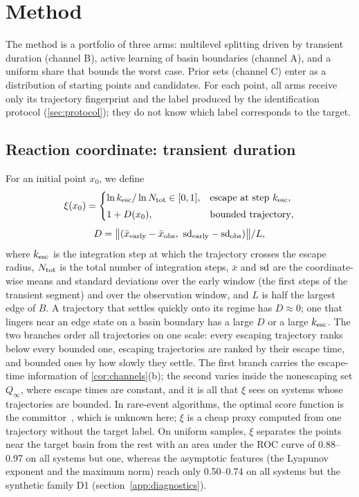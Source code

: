 \section{Method}\label{sec:method}

The method is a portfolio of three arms: multilevel splitting driven by transient duration (channel B), active learning of basin boundaries (channel A), and a uniform share that bounds the worst case. Prior sets (channel C) enter as a distribution of starting points and candidates. For each point, all arms receive only its trajectory fingerprint and the label produced by the identification protocol (\cref{sec:protocol}); they do not know which label corresponds to the target.

\subsection{Reaction coordinate: transient duration}\label{sec:xi}

For an initial point $x_0$, we define
\begin{equation}
\xi(x_0)=\begin{cases}\ln k_{\rm esc}/\ln N_{\rm tot}\in[0,1], & \text{escape at step } k_{\rm esc},\\[1mm] 1+D(x_0), & \text{bounded trajectory},\end{cases}
\label{eq:xi}
\end{equation}
\begin{equation*}
D=\bigl\|(\bar x_{\rm early}-\bar x_{\rm obs},\ {\rm sd}_{\rm early}-{\rm sd}_{\rm obs})\bigr\|/L,
\end{equation*}
where $k_{\rm esc}$ is the integration step at which the trajectory crosses the escape radius, $N_{\rm tot}$ is the total number of integration steps, $\bar x$ and ${\rm sd}$ are the coordinate-wise means and standard deviations over the early window (the first steps of the transient segment) and over the observation window, and $L$ is half the largest edge of $B$. A trajectory that settles quickly onto its regime has $D\approx0$; one that lingers near an edge state on a basin boundary has a large $D$ or a large $k_{\rm esc}$. The two branches order all trajectories on one scale: every escaping trajectory ranks below every bounded one, escaping trajectories are ranked by their escape time, and bounded ones by how slowly they settle. The first branch carries the escape-time information of \cref{cor:channels}(b); the second varies inside the nonescaping set $Q_\infty$, where escape times are constant, and it is all that $\xi$ sees on systems whose trajectories are bounded. In rare-event algorithms, the optimal score function is the committor~\cite{Lestang2018TAMS,Lucente2022Committor}, which is unknown here; $\xi$ is a cheap proxy computed from one trajectory without the target label. On uniform samples, $\xi$ separates the points near the target basin from the rest with an area under the ROC curve of 0.88--0.97 on all systems but one, whereas the asymptotic features (the Lyapunov exponent and the maximum norm) reach only 0.50--0.74 on all systems but the synthetic family D1 (section~\ref{app:diagnostics}).

